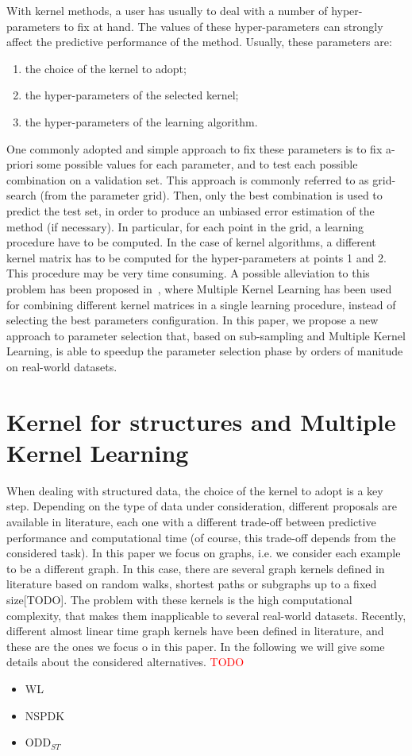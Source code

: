 \documentclass{esannV2}
\newcommand{\1}{{\bf 1}}
\begin{document}
With kernel methods, a user has usually to deal with a number of hyper-parameters to fix at hand. The values of these hyper-parameters can strongly affect the predictive performance of the method.
Usually, these parameters are:
\begin{enumerate}
 \item the choice of the kernel to adopt;
 \item the hyper-parameters of the selected kernel;
 \item the hyper-parameters of the learning algorithm.
\end{enumerate}
One commonly adopted and simple approach to fix these parameters is to fix a-priori some possible values for each parameter, and to test each possible combination on a validation set. This approach is commonly referred to as grid-search (from the parameter grid).
Then, only the best combination is used to predict the test set, in order to produce an unbiased error estimation of the method (if necessary).
In particular, for each point in the grid, a learning procedure have to be computed. In the case of kernel algorithms, a different kernel matrix has to be computed for the hyper-parameters at points 1 and 2.
This procedure may be very time consuming.
A possible alleviation to this problem has been proposed in~\cite{Massimo2016}, where Multiple Kernel Learning has been used for combining different kernel matrices in a single learning procedure, instead of selecting the best parameters configuration.
In this paper, we propose a new approach to parameter selection that, based on sub-sampling and Multiple Kernel Learning, is able to speedup the parameter selection phase by orders of manitude on real-world datasets.

\section{Kernel for structures and Multiple Kernel Learning}
When dealing with structured data, the choice of the kernel to adopt is a key step. Depending on the type of data under consideration, different proposals are available in literature, each one with a different trade-off between predictive performance and computational time (of course, this trade-off depends from the considered task).
In this paper we focus on graphs, i.e. we consider each example to be a different graph.
In this case, there are several graph kernels defined in literature based on random walks, shortest paths or subgraphs up to a fixed size[TODO]. The problem with these kernels is the high computational complexity, that makes them inapplicable to several real-world datasets.
Recently, different almost linear time graph kernels have been defined in literature, and these are the ones we focus o in this paper.
In the following we will give some details about the considered alternatives.
\textcolor{red}{TODO}\\
\begin{itemize}
 \item WL
 \item NSPDK
 \item ODD$_{ST}$
\end{itemize}
\end{document}
